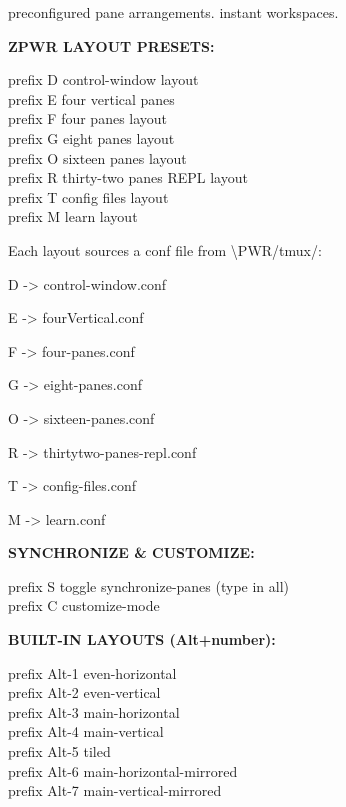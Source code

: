 \documentclass[11pt,a4paper,twoside]{book}
\begin{document}
preconfigured pane arrangements. instant workspaces.


\vspace{12pt}
{\bfseries\color{neonyellow} ZPWR LAYOUT PRESETS:}\vspace{4pt}

\begin{codebox}
prefix D              control-window layout\\
prefix E              four vertical panes\\
prefix F              four panes layout\\
prefix G              eight panes layout\\
prefix O              sixteen panes layout\\
prefix R              thirty-two panes REPL layout\\
prefix T              config files layout\\
prefix M              learn layout\\
\end{codebox}

Each layout sources a conf file from \textbackslash{}PWR/tmux/:

D -> control-window.conf

E -> fourVertical.conf

F -> four-panes.conf

G -> eight-panes.conf

O -> sixteen-panes.conf

R -> thirtytwo-panes-repl.conf

T -> config-files.conf

M -> learn.conf


\vspace{12pt}
{\bfseries\color{neonyellow} SYNCHRONIZE \& CUSTOMIZE:}\vspace{4pt}

\begin{codebox}
prefix S              toggle synchronize-panes (type in all)\\
prefix C              customize-mode\\
\end{codebox}


\vspace{12pt}
{\bfseries\color{neonyellow} BUILT-IN LAYOUTS (Alt+number):}\vspace{4pt}

\begin{codebox}
prefix Alt-1          even-horizontal\\
prefix Alt-2          even-vertical\\
prefix Alt-3          main-horizontal\\
prefix Alt-4          main-vertical\\
prefix Alt-5          tiled\\
prefix Alt-6          main-horizontal-mirrored\\
prefix Alt-7          main-vertical-mirrored\\
\end{codebox}
\end{document}
